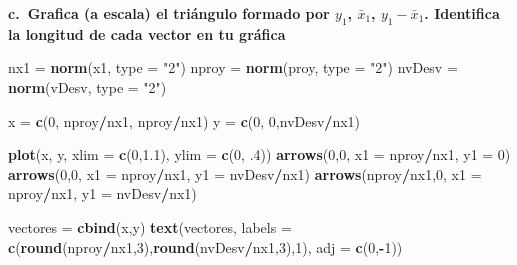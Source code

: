 \documentclass[
]{article}
\newenvironment{Shaded}{\begin{snugshade}}{\end{snugshade}}
\newcommand{\DataTypeTok}[1]{\textcolor[rgb]{0.13,0.29,0.53}{#1}}
\newcommand{\DecValTok}[1]{\textcolor[rgb]{0.00,0.00,0.81}{#1}}
\newcommand{\FloatTok}[1]{\textcolor[rgb]{0.00,0.00,0.81}{#1}}
\newcommand{\KeywordTok}[1]{\textcolor[rgb]{0.13,0.29,0.53}{\textbf{#1}}}
\newcommand{\NormalTok}[1]{#1}
\newcommand{\OperatorTok}[1]{\textcolor[rgb]{0.81,0.36,0.00}{\textbf{#1}}}
\newcommand{\StringTok}[1]{\textcolor[rgb]{0.31,0.60,0.02}{#1}}
\begin{document}
\textbf{c.~Grafica (a escala) el triángulo formado por \(y_1\),
\(\bar{x}_1\), \(y_1-\bar{x}_1\). Identifica la longitud de cada vector
en tu gráfica}

\begin{Shaded}
\begin{Highlighting}[]
\NormalTok{  nx1 =}\StringTok{ }\KeywordTok{norm}\NormalTok{(x1, }\DataTypeTok{type =} \StringTok{"2"}\NormalTok{)}
\NormalTok{  nproy =}\StringTok{ }\KeywordTok{norm}\NormalTok{(proy, }\DataTypeTok{type =} \StringTok{"2"}\NormalTok{)}
\NormalTok{  nvDesv =}\StringTok{ }\KeywordTok{norm}\NormalTok{(vDesv, }\DataTypeTok{type =} \StringTok{"2"}\NormalTok{)}

  
\NormalTok{  x =}\StringTok{ }\KeywordTok{c}\NormalTok{(}\DecValTok{0}\NormalTok{, nproy}\OperatorTok{/}\NormalTok{nx1, nproy}\OperatorTok{/}\NormalTok{nx1)}
\NormalTok{  y =}\StringTok{ }\KeywordTok{c}\NormalTok{(}\DecValTok{0}\NormalTok{, }\DecValTok{0}\NormalTok{,nvDesv}\OperatorTok{/}\NormalTok{nx1)}
  
  \KeywordTok{plot}\NormalTok{(x, y, }\DataTypeTok{xlim =} \KeywordTok{c}\NormalTok{(}\DecValTok{0}\NormalTok{,}\FloatTok{1.1}\NormalTok{), }\DataTypeTok{ylim =} \KeywordTok{c}\NormalTok{(}\DecValTok{0}\NormalTok{, }\FloatTok{.4}\NormalTok{))}
  \KeywordTok{arrows}\NormalTok{(}\DecValTok{0}\NormalTok{,}\DecValTok{0}\NormalTok{, }\DataTypeTok{x1 =}\NormalTok{ nproy}\OperatorTok{/}\NormalTok{nx1, }\DataTypeTok{y1 =} \DecValTok{0}\NormalTok{)}
  \KeywordTok{arrows}\NormalTok{(}\DecValTok{0}\NormalTok{,}\DecValTok{0}\NormalTok{, }\DataTypeTok{x1 =}\NormalTok{ nproy}\OperatorTok{/}\NormalTok{nx1, }\DataTypeTok{y1 =}\NormalTok{ nvDesv}\OperatorTok{/}\NormalTok{nx1)}
  \KeywordTok{arrows}\NormalTok{(nproy}\OperatorTok{/}\NormalTok{nx1,}\DecValTok{0}\NormalTok{, }\DataTypeTok{x1 =}\NormalTok{ nproy}\OperatorTok{/}\NormalTok{nx1, }\DataTypeTok{y1 =}\NormalTok{ nvDesv}\OperatorTok{/}\NormalTok{nx1)}
  
\NormalTok{  vectores =}\StringTok{ }\KeywordTok{cbind}\NormalTok{(x,y)}
  \KeywordTok{text}\NormalTok{(vectores, }\DataTypeTok{labels =} \KeywordTok{c}\NormalTok{(}\KeywordTok{round}\NormalTok{(nproy}\OperatorTok{/}\NormalTok{nx1,}\DecValTok{3}\NormalTok{),}\KeywordTok{round}\NormalTok{(nvDesv}\OperatorTok{/}\NormalTok{nx1,}\DecValTok{3}\NormalTok{),}\DecValTok{1}\NormalTok{), }\DataTypeTok{adj =} \KeywordTok{c}\NormalTok{(}\DecValTok{0}\NormalTok{,}\OperatorTok{-}\DecValTok{1}\NormalTok{))}
\end{Highlighting}
\end{Shaded}
\end{document}
